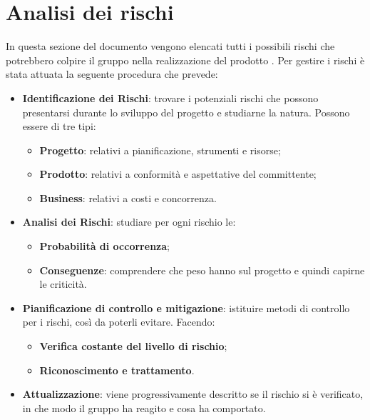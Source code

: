 \newpage
\section{Analisi dei rischi}

	In questa sezione del documento vengono elencati tutti i possibili rischi che potrebbero colpire il gruppo \gruppo{} nella realizzazione del prodotto \progetto. Per gestire i rischi è stata attuata la seguente procedura che prevede: 
	
	\begin{itemize}
		
		\item \textbf{Identificazione dei Rischi}: trovare i potenziali rischi che possono presentarsi durante lo sviluppo del progetto e studiarne la natura. Possono essere di tre tipi:
			\begin{itemize}
				\item \textbf{Progetto}: relativi a pianificazione, strumenti e risorse;
				\item \textbf{Prodotto}: relativi a conformità e aspettative del committente;
				\item \textbf{Business}: relativi a costi e concorrenza.
			\end{itemize} 
				
		\item \textbf{Analisi dei Rischi}: studiare per ogni rischio le: 	
			\begin{itemize}
				\item \textbf{Probabilità di occorrenza};
				\item \textbf{Conseguenze}: comprendere che peso hanno sul progetto e quindi capirne le criticità.		
			\end{itemize}
		
		\item \textbf{Pianificazione di controllo e mitigazione}: istituire metodi di controllo per i rischi, così da poterli evitare. Facendo:
			\begin{itemize}
				\item \textbf{Verifica costante del livello di rischio};
				\item \textbf{Riconoscimento e trattamento}.
			\end{itemize}
			
		\item \textbf{Attualizzazione}: viene progressivamente descritto se il rischio si è verificato, in che modo il gruppo ha reagito e cosa ha comportato. 
		
	\end{itemize}
	
